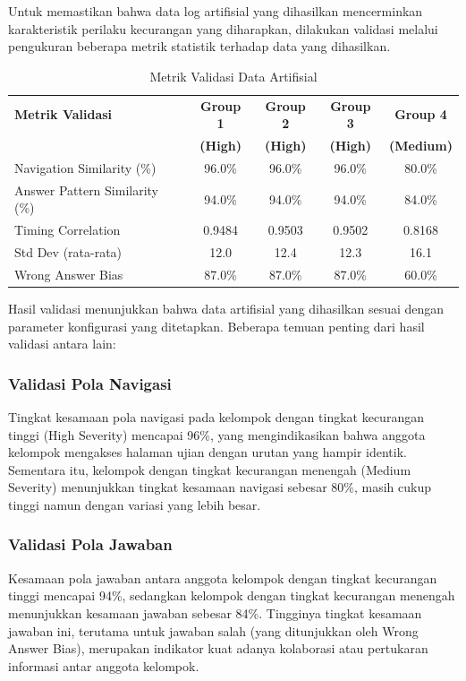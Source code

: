 Untuk memastikan bahwa data log artifisial yang dihasilkan mencerminkan karakteristik perilaku kecurangan yang diharapkan, dilakukan validasi melalui pengukuran beberapa metrik statistik terhadap data yang dihasilkan.

\begin{table}[htbp]
\centering
\caption{Metrik Validasi Data Artifisial}
\label{tabel:metrikValidasi}
\begin{tabular}{|p{2.8cm}|c|c|c|c|}
\hline
\textbf{Metrik Validasi} & \textbf{Group 1} & \textbf{Group 2} & \textbf{Group 3} & \textbf{Group 4} \\
\textbf{} & \textbf{(High)} & \textbf{(High)} & \textbf{(High)} & \textbf{(Medium)} \\
\hline
Navigation Similarity (\%) & 96.0\% & 96.0\% & 96.0\% & 80.0\% \\
\hline
Answer Pattern Similarity (\%) & 94.0\% & 94.0\% & 94.0\% & 84.0\% \\
\hline
Timing Correlation & 0.9484 & 0.9503 & 0.9502 & 0.8168 \\
\hline
Std Dev (rata-rata) & 12.0 & 12.4 & 12.3 & 16.1 \\
\hline
Wrong Answer Bias & 87.0\% & 87.0\% & 87.0\% & 60.0\% \\
\hline
\end{tabular}
\end{table}

Hasil validasi menunjukkan bahwa data artifisial yang dihasilkan sesuai dengan parameter konfigurasi yang ditetapkan. Beberapa temuan penting dari hasil validasi antara lain:

\subsubsection{Validasi Pola Navigasi}
Tingkat kesamaan pola navigasi pada kelompok dengan tingkat kecurangan tinggi (High Severity) mencapai 96\%, yang mengindikasikan bahwa anggota kelompok mengakses halaman ujian dengan urutan yang hampir identik. Sementara itu, kelompok dengan tingkat kecurangan menengah (Medium Severity) menunjukkan tingkat kesamaan navigasi sebesar 80\%, masih cukup tinggi namun dengan variasi yang lebih besar.

\subsubsection{Validasi Pola Jawaban}
Kesamaan pola jawaban antara anggota kelompok dengan tingkat kecurangan tinggi mencapai 94\%, sedangkan kelompok dengan tingkat kecurangan menengah menunjukkan kesamaan jawaban sebesar 84\%. Tingginya tingkat kesamaan jawaban ini, terutama untuk jawaban salah (yang ditunjukkan oleh Wrong Answer Bias), merupakan indikator kuat adanya kolaborasi atau pertukaran informasi antar anggota kelompok.

